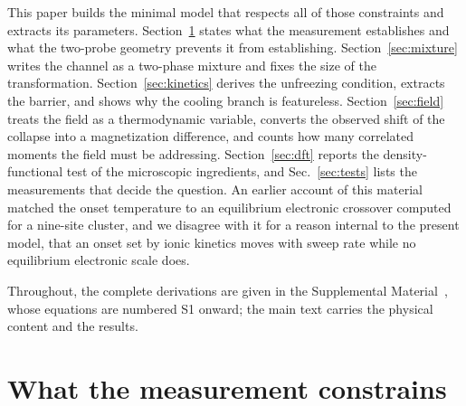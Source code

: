 \documentclass[reprint,twocolumn,prb,amsmath,amssymb,superscriptaddress,floatfix]{revtex4-2}
\begin{document}
This paper builds the minimal model that respects all of those constraints and extracts its
parameters. Section~\ref{sec:constraints} states what the measurement establishes and what the
two-probe geometry prevents it from establishing. Section~\ref{sec:mixture} writes the channel
as a two-phase mixture and fixes the size of the transformation. Section~\ref{sec:kinetics}
derives the unfreezing condition, extracts the barrier, and shows why the cooling branch is
featureless. Section~\ref{sec:field} treats the field as a thermodynamic variable, converts
the observed shift of the collapse into a magnetization difference, and counts how many
correlated moments the field must be addressing. Section~\ref{sec:dft} reports the
density-functional test of the microscopic ingredients, and Sec.~\ref{sec:tests} lists the
measurements that decide the question. An earlier account of this material matched the onset
temperature to an equilibrium electronic crossover computed for a nine-site cluster, and we
disagree with it for a reason internal to the present model, that an onset set by ionic kinetics
moves with sweep rate while no equilibrium electronic scale does.

Throughout, the complete derivations are given in the Supplemental Material~\cite{SM}, whose
equations are numbered S1 onward; the main text carries the physical content and the results.

\section{What the measurement constrains}
\label{sec:constraints}
\end{document}
